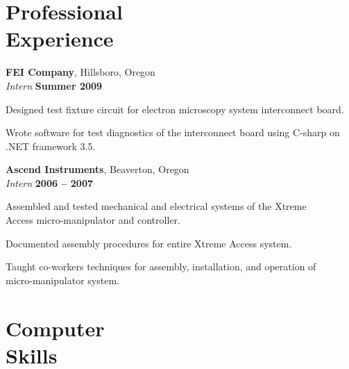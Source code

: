 \documentclass[margin,line]{resume}
\begin{document}
\begin{resume}
    \section{\mysidestyle Professional\\Experience}

    \textbf{FEI Company}, Hillsboro, Oregon\vspace{2mm}\\\vspace{1mm}%
    \textsl{Intern} \hfill \textbf{Summer 2009}\vspace{-3mm}\\\vspace{-1mm}%
    \begin{list2}
    \item Designed test fixture circuit for electron microscopy system interconnect board.
    \item Wrote software for test diagnostics of the interconnect board using C-sharp on\\
        .NET framework 3.5.
    \end{list2}\vspace{-1.5mm}

    \textbf{Ascend Instruments}, Beaverton, Oregon \vspace{2mm}\\\vspace{1mm}%
    \textsl{Intern} \hfill \textbf{2006 -- 2007}\vspace{-3mm}\\\vspace{-1mm}%
    \begin{list2}
    \item Assembled and tested mechanical and electrical systems of the Xtreme\\
        Access micro-manipulator and controller.
    \item Documented assembly procedures for entire Xtreme Access system.
    \item Taught co-workers techniques for assembly, installation, and operation of \\
        micro-manipulator system.\\
    \end{list2}\vspace{-1.5mm}
    \section{\mysidestyle Computer\\Skills} 


\end{resume}
\end{document}
